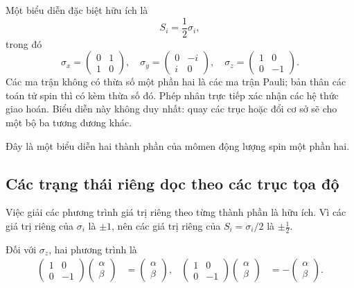 Một biểu diễn đặc biệt hữu ích là
\begin{equation}
S_i=\frac12\sigma_i,
\end{equation}
trong đó
\begin{equation}
\sigma_x=
\begin{pmatrix}
0&1\\
1&0
\end{pmatrix},
\quad
\sigma_y=
\begin{pmatrix}
0&-i\\
i&0
\end{pmatrix},
\quad
\sigma_z=
\begin{pmatrix}
1&0\\
0&-1
\end{pmatrix}.
\end{equation}
Các ma trận không có thừa số một phần hai là các ma trận Pauli; bản thân các toán tử spin thì có kèm thừa số đó. Phép nhân trực tiếp xác nhận các hệ thức giao hoán. Biểu diễn này không duy nhất: quay các trục hoặc đổi cơ sở sẽ cho một bộ ba tương đương khác.

Đây là một biểu diễn hai thành phần của mômen động lượng spin một phần hai.

\subsection{Các trạng thái riêng dọc theo các trục tọa độ}

Việc giải các phương trình giá trị riêng theo từng thành phần là hữu ích. Vì các giá trị riêng của \(\sigma_i\) là \(\pm1\), nên các giá trị riêng của \(S_i=\sigma_i/2\) là \(\pm\tfrac12\).

Đối với \(\sigma_z\), hai phương trình là
\begin{align}
\begin{pmatrix}
1&0\\
0&-1
\end{pmatrix}
\begin{pmatrix}
\alpha\\
\beta
\end{pmatrix}
&=
\begin{pmatrix}
\alpha\\
\beta
\end{pmatrix},
&
\begin{pmatrix}
1&0\\
0&-1
\end{pmatrix}
\begin{pmatrix}
\alpha\\
\beta
\end{pmatrix}
&=
-
\begin{pmatrix}
\alpha\\
\beta
\end{pmatrix}.
\end{align}

